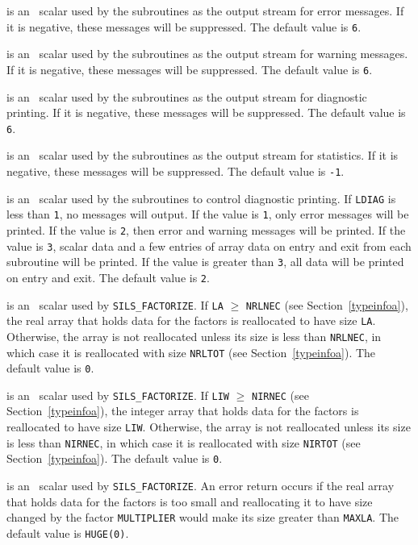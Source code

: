 \documentclass{galahad}
\newcommand{\packagename}{SILS}
\begin{document}
\begin{description}

 is an \integer\ scalar used by the subroutines as the output
 stream for error messages.  If it is negative, these
 messages will be suppressed.  The default value is {\tt 6}.

 is an \integer\ scalar used by the subroutines as the output
 stream for warning messages.  If it is negative, these messages
 will be suppressed.  The default value is {\tt 6}.

 is an \integer\ scalar used by the subroutines as the output
 stream for diagnostic printing.  If it is negative, these messages
 will be suppressed.  The default value is {\tt 6}.

 is an \integer\ scalar used by the subroutines as the output
 stream for statistics. If it is negative, these messages will
 be suppressed.  The default value is {\tt -1}.

 is an \integer\ scalar used by the subroutines to control
 diagnostic printing.  If {\tt LDIAG} is less than {\tt 1}, no messages will
 output. If the value is {\tt 1}, only error messages will
 be printed.  If the value is {\tt 2}, then error and warning messages will
 be printed. If the value is {\tt 3}, scalar data and a few
 entries of array data on entry and exit from each subroutine will be
 printed.  If the value is greater than {\tt 3}, all data will be printed on
 entry and
 exit.  The default value is {\tt 2}.

 is an \integer\ scalar used by {\tt \packagename\_FACTORIZE}.
If {\tt LA} $\geq$
{\tt NRLNEC} (see Section~\ref{typeinfoa}), the real array that holds data for the
factors is reallocated to have size {\tt LA}.  Otherwise, the array is not
reallocated unless its size is less than {\tt NRLNEC}, in which case it is
reallocated with size {\tt NRLTOT} (see Section~\ref{typeinfoa}). The default value
is {\tt 0}.

 is an \integer\ scalar used by {\tt \packagename\_FACTORIZE}. If
{\tt LIW} $\geq$
{\tt NIRNEC} (see Section~\ref{typeinfoa}), the integer
array that holds data for the
factors is reallocated to have size {\tt LIW}.  Otherwise, the array is not
reallocated unless its size is less than {\tt NIRNEC}, in which case it is
reallocated with size {\tt NIRTOT} (see Section~\ref{typeinfoa}).
The default value
is {\tt 0}.

 is an \integer\ scalar used by {\tt \packagename\_FACTORIZE}.
An error
return occurs if the real array that holds data for the factors is too
small and reallocating it to have size changed by the factor {\tt MULTIPLIER}
would make its size greater than {\tt MAXLA}. The default value is
{\tt HUGE(0)}.


\end{description}
\end{document}
